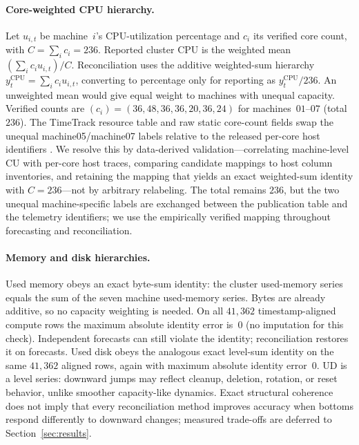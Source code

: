 \documentclass[a4paper,fleqn]{cas-dc}
\begin{document}
\paragraph{Core-weighted {CPU} hierarchy.}
Let $u_{i,t}$ be machine~$i$'s {CPU}-utilization percentage and $c_i$ its
verified core count, with $C=\sum_i c_i=236$.
Reported cluster {CPU} is the weighted mean $(\sum_i c_i u_{i,t})/C$.
Reconciliation uses the additive weighted-sum hierarchy
$y^{\mathrm{CPU}}_t=\sum_i c_i u_{i,t}$, converting to percentage only for
reporting as $y^{\mathrm{CPU}}_t/236$.
An unweighted mean would give equal weight to machines with unequal capacity.
Verified counts are
$(c_i)=(36,48,36,36,20,36,24)$ for machines~$01$--$07$ (total~$236$).
The TimeTrack resource table and raw static core-count fields swap the unequal
machine05/machine07 labels relative to the released per-core host identifiers
\cite{meliani2025timetrack}.
We resolve this by data-derived validation---correlating machine-level {CU}
with per-core host traces, comparing candidate mappings to host column
inventories, and retaining the mapping that yields an exact weighted-sum
identity with $C=236$---not by arbitrary relabeling.
The total remains $236$, but the two unequal machine-specific labels are
exchanged between the publication table and the telemetry identifiers; we use
the empirically verified mapping throughout forecasting and reconciliation.

\paragraph{Memory and disk hierarchies.}
Used memory obeys an exact byte-sum identity: the cluster used-memory series
equals the sum of the seven machine used-memory series.
Bytes are already additive, so no capacity weighting is needed.
On all $41{,}362$ timestamp-aligned compute rows the maximum absolute identity
error is~$0$ (no imputation for this check).
Independent forecasts can still violate the identity; reconciliation restores
it on forecasts.
Used disk obeys the analogous exact level-sum identity on the same
$41{,}362$ aligned rows, again with maximum absolute identity error~$0$.
{UD} is a level series: downward jumps may reflect cleanup, deletion, rotation,
or reset behavior, unlike smoother capacity-like dynamics.
Exact structural coherence does not imply that every reconciliation method
improves accuracy when bottoms respond differently to downward changes;
measured trade-offs are deferred to Section~\ref{sec:results}.
\end{document}
